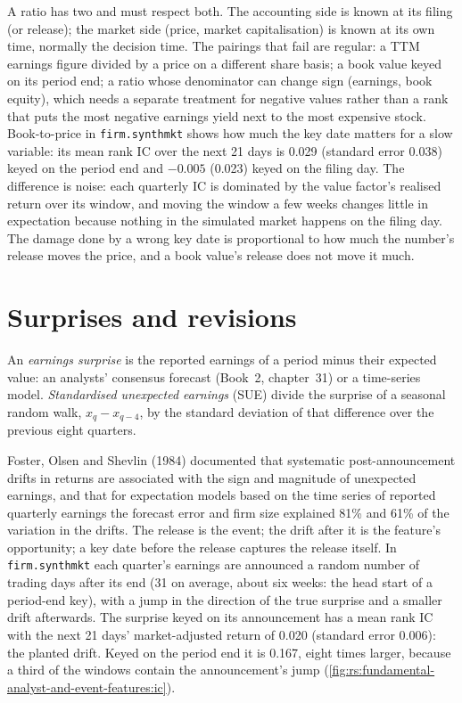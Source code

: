 A ratio has two  and must respect both. The accounting side is known at its filing (or release); the market side
(price, market capitalisation) is known at its own time, normally the decision time. The pairings that fail are regular: a TTM earnings
figure divided by a price on a different share basis; a book value keyed on its period end; a ratio whose denominator can change sign
(earnings, book equity), which needs a separate treatment for negative values rather than a rank that puts the most negative earnings
yield next to the most expensive stock. Book-to-price in \texttt{firm.synthmkt} shows how much the key date matters for a slow variable:
its mean rank IC over the next 21 days is 0.029 (standard error 0.038) keyed on the period end and $-0.005$ (0.023) keyed on the filing
day. The difference is noise: each quarterly IC is dominated by the value factor's realised return over its window, and moving the window
a few weeks changes little in expectation because nothing in the simulated market happens on the filing day. The damage done by a wrong key
date is proportional to how much the number's release moves the price, and a book value's release does not move it much.

\section{Surprises and revisions}

\begin{definition}\label{def:rs:fundamental-analyst-and-event-features:sue}
An \emph{earnings surprise} is the reported earnings of a period minus their expected value: an analysts' consensus
forecast (Book~2, chapter~31) or a time-series model. \emph{Standardised unexpected earnings} (SUE)
divide the surprise of a seasonal random walk, $x_q - x_{q-4}$, by the standard deviation of that difference over the previous eight
quarters.
\end{definition}

Foster, Olsen and Shevlin (1984) documented that systematic post-announcement drifts in returns are associated with the sign and magnitude of
unexpected earnings, and that for expectation models based on the time series of reported quarterly earnings the forecast error and firm
size explained 81\% and 61\% of the variation in the drifts. The release is the event; the drift after it is the feature's opportunity; a
key date before the release captures the release itself. In \texttt{firm.synthmkt} each quarter's earnings are announced a random number of trading days after its end (31 on average, about six weeks: the head start of a period-end key), with a jump in the direction of the true
surprise and a smaller drift afterwards. The surprise keyed on its announcement has a mean rank IC with the next 21 days' market-adjusted
return of 0.020 (standard error 0.006): the planted drift. Keyed on the period end it is 0.167, eight times larger, because a third of the
windows contain the announcement's jump (\cref{fig:rs:fundamental-analyst-and-event-features:ic}).

